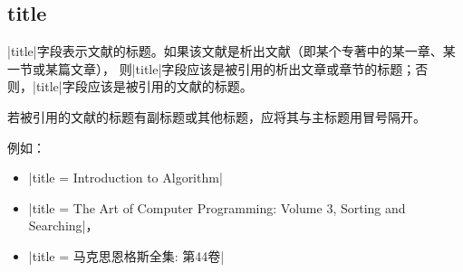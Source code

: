 
\subsection{title}\label{subsec:bibfield-title}

|title|字段表示文献的标题。如果该文献是析出文献（即某个专著中的某一章、某一节或某篇文章），
则|title|字段应该是被引用的析出文章或章节的标题；否则，|title|字段应该是被引用的文献的标题。

若被引用的文献的标题有副标题或其他标题，应将其与主标题用冒号隔开。

例如：
\begin{itemize}
\item |title = {Introduction to Algorithm}|
\item |title = {The Art of Computer Programming: Volume 3, Sorting and Searching}|，
\item |title = {马克思恩格斯全集: 第44卷}|
\end{itemize}

